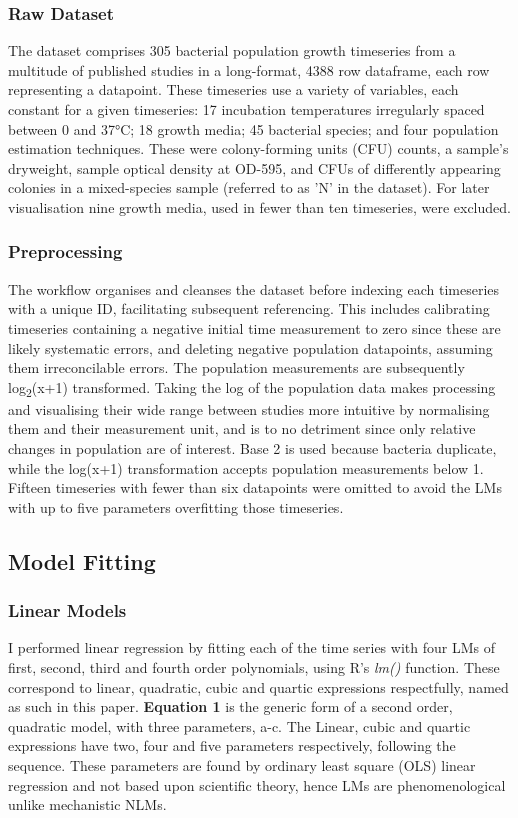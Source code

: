 \documentclass[11pt]{article}
\begin{document}
\subsubsection{Raw Dataset}
 The dataset comprises 305 bacterial population growth timeseries from a multitude of published studies in a long-format, 4388 row dataframe, each row representing a datapoint. These timeseries use a variety of variables, each constant for a given timeseries: 17 incubation temperatures irregularly spaced between 0 and 37°C; 18 growth media; 45 bacterial species; and four population estimation techniques. These were colony-forming units (CFU) counts, a sample's dryweight, sample optical density at OD-595, and CFUs of differently appearing colonies in a mixed-species sample (referred to as 'N' in the dataset).\parencite{Al-qadiri2008} For later visualisation nine growth media, used in fewer than ten timeseries, were excluded.

\subsubsection{Preprocessing}
The workflow organises and cleanses the dataset before indexing each timeseries with a unique ID, facilitating subsequent referencing. This includes calibrating timeseries containing a negative initial time measurement to zero since these are likely systematic errors, and deleting negative population datapoints, assuming them irreconcilable errors.
The population measurements are subsequently log\textsubscript{2}(x+1) transformed. Taking the log of the population data makes processing and visualising their wide range between studies more intuitive by normalising them and their measurement unit, and is to no detriment since only relative changes in population are of interest. Base 2 is used because bacteria duplicate, while the log(x+1) transformation accepts population measurements below 1. Fifteen timeseries with fewer than six datapoints were omitted to avoid the LMs with up to five parameters overfitting those timeseries.



\subsection{Model Fitting}

\subsubsection{Linear Models}
I performed linear regression by fitting each of the time series with four LMs of first, second, third and fourth order polynomials, using R's \textit{lm()} function. These correspond to linear, quadratic, cubic and quartic expressions respectfully, named as such in this paper. \textbf{Equation 1} is the generic form of a second order, quadratic model, with three parameters, a-c. The Linear, cubic and quartic expressions have two, four and five parameters respectively, following the sequence. These parameters are found by ordinary least square (OLS) linear regression and not based upon scientific theory, hence LMs are phenomenological unlike mechanistic NLMs. 
\end{document}
